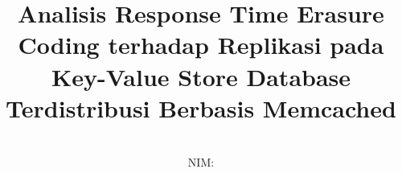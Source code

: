 \documentclass[bahasa, 12pt, a4paper, onecolumn, oneside, final]{report}
\begin{document}
\title{Analisis Response Time Erasure Coding terhadap Replikasi pada Key-Value Store Database Terdistribusi Berbasis Memcached}
\date{}
\author{
  \authorname \\
  NIM: \authornim
}




% 

\pagestyle{plain}



% 







% 
% 
% 
% 
% 




% 
\end{document}
